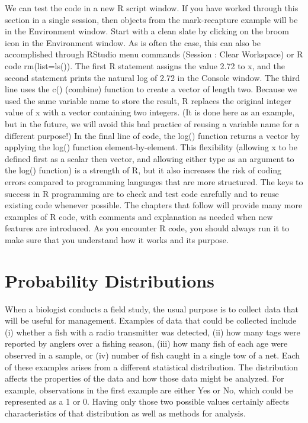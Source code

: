 \documentclass[
]{krantz}
\begin{document}
We can test the code in a new R script window. If you have worked through this section in a single session, then objects from the mark-recapture example will be in the Environment window. Start with a clean slate by clicking on the broom icon in the Environment window. As is often the case, this can also be accomplished through RStudio menu commands (Session : Clear Workspace) or R code rm(list=ls()). The first R statement assigns the value 2.72 to x, and the second statement prints the natural log of 2.72 in the Console window. The third line uses the c() (combine) function to create a vector of length two. Because we used the same variable name to store the result, R replaces the original integer value of x with a vector containing two integers. (It is done here as an example, but in the future, we will avoid this bad practice of reusing a variable name for a different purpose!) In the final line of code, the log() function returns a vector by applying the log() function element-by-element. This flexibility (allowing x to be defined first as a scalar then vector, and allowing either type as an argument to the log() function) is a strength of R, but it also increases the risk of coding errors compared to programming languages that are more structured. The keys to success in R programming are to check and test code carefully and to reuse existing code whenever possible. The chapters that follow will provide many more examples of R code, with comments and explanation as needed when new features are introduced. As you encounter R code, you should always run it to make sure that you understand how it works and its purpose.

\hypertarget{Distributions}{%
\chapter{Probability Distributions}\label{Distributions}}

When a biologist conducts a field study, the usual purpose is to collect data that will be useful for management. Examples of data that could be collected include (i) whether a fish with a radio transmitter was detected, (ii) how many tags were reported by anglers over a fishing season, (iii) how many fish of each age were observed in a sample, or (iv) number of fish caught in a single tow of a net. Each of these examples arises from a different statistical distribution. The distribution affects the properties of the data and how those data might be analyzed. For example, observations in the first example are either Yes or No, which could be represented as a 1 or 0. Having only those two possible values certainly affects characteristics of that distribution as well as methods for analysis.
\end{document}
